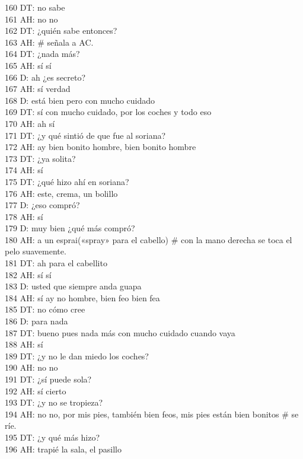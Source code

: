 160 DT: no sabe\\
161 AH: no no\\
162 DT: ¿quién sabe entonces?\\
163 AH: \# señala a AC.\\
164 DT: ¿nada más?\\
165 AH: sí sí\\
166 D: ah ¿es secreto?\\
167 AH: sí verdad\\
168 D: está bien pero con mucho cuidado\\
169 DT: sí con mucho cuidado, por los coches y todo eso\\
170 AH: ah sí\\
171 DT: ¿y qué sintió de que fue al soriana?\\
172 AH: ay bien bonito hombre, bien bonito hombre\\
173 DT: ¿ya solita?\\
174 AH: sí\\
175 DT: ¿qué hizo ahí en soriana?\\
176 AH: este, crema, un bolillo\\
177 D: ¿eso compró?\\
178 AH: sí\\
179 D: muy bien ¿qué más compró?\\
180 AH: a un esprai(«spray» para el cabello) \# con la mano derecha se toca el pelo suavemente.\\
181 DT: ah para el cabellito\\
182 AH: sí sí\\
183 D: usted que siempre anda guapa\\
184 AH: sí ay no hombre, bien feo bien fea\\
185 DT: no cómo cree\\
186 D: para nada\\
187 DT: bueno pues nada más con mucho cuidado cuando vaya\\
188 AH: sí\\
189 DT: ¿y no le dan miedo los coches?\\
190 AH: no no\\
191 DT: ¿sí puede sola?\\
192 AH: sí cierto\\
193 DT: ¿y no se tropieza?\\
194 AH: no no, por mis pies, también bien feos, mis pies están bien bonitos \# se ríe.\\
195 DT: ¿y qué más hizo?\\
196 AH: trapié la sala, el pasillo\\
